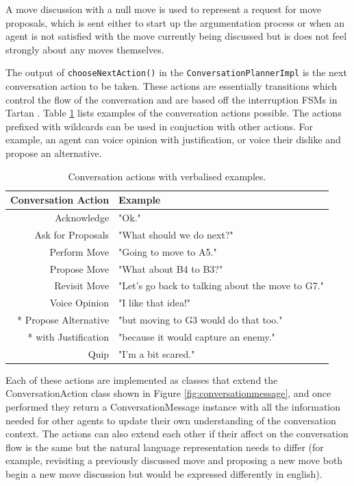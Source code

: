 \documentclass[conference]{IEEEtran}
\begin{document}
A move discussion with a null move is used to represent a request for move proposals, which is sent either to start up the argumentation process or when an agent is not satisfied with the move currently being discussed but is does not feel strongly about any moves themselves.

The output of \lstinline{chooseNextAction()} in the \lstinline{ConversationPlannerImpl} is the next conversation action to be taken. These actions are essentially transitions which control the flow of the conversation and are based off the interruption FSMs in Tartan \cite{tartan}. Table \ref{tbl:conversationaction} lists examples of the conversation actions possible. The actions prefixed with wildcards can be used in conjuction with other actions. For example, an agent can voice opinion with justification, or voice their dislike and propose an alternative. 

\begin{table} 
\centering
\caption{Conversation actions with verbalised examples.} 
\label{tbl:conversationaction}
\begin{tabular}{ r|l } 
	Conversation Action & Example \\
 \hline
	Acknowledge & "Ok." \\ 
	Ask for Proposals & "What should we do next?" \\ 
	Perform Move & "Going to move to A5." \\ 
	Propose Move & "What about B4 to B3?" \\ 
	Revisit Move & "Let's go back to talking about the move to G7." \\ 
	Voice Opinion & "I like that idea!" \\ 
	* Propose Alternative & "but moving to G3 would do that too." \\ 
	* with Justification & "because it would capture an enemy."  \\ 
	Quip & "I'm a bit scared."  \\ 
 \hline
\end{tabular}
\end{table}

Each of these actions are implemented as classes that extend the ConversationAction class shown in Figure \ref{fig:conversationmessage}, and once performed they return a ConversationMessage instance with all the information needed for other agents to update their own understanding of the conversation context. The actions can also extend each other if their affect on the conversation flow is the same but the natural language representation needs to differ (for example, revisiting a previously discussed move and proposing a new move both begin a new move discussion but would be expressed differently in english).
\end{document}
